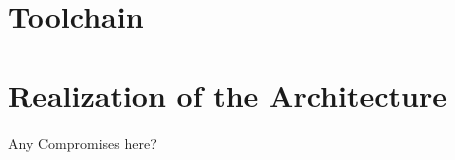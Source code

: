 
\section{Toolchain} %
\label{sec:toolchain}


\section{Realization of the Architecture} %
\label{sec:realization_of_the_architecture}
Any Compromises here?
